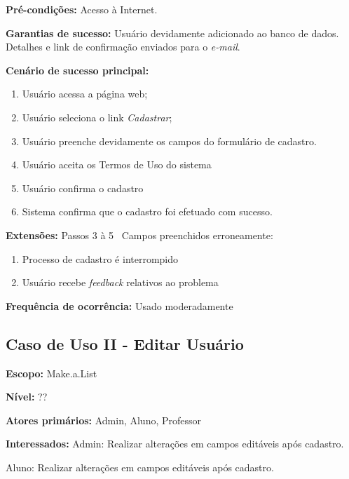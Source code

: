 \documentclass[12pt,oneside,a4paper,article]{abntex2}
\begin{document}
		\textbf{Pré-condições:} Acesso à Internet.
		
		\textbf{Garantias de sucesso:} Usuário devidamente adicionado ao banco de dados. Detalhes e link de confirmação enviados para o \textit{e-mail}.  
		
		\textbf{Cenário de sucesso principal:}
		
		\begin{enumerate}
			\item Usuário acessa a página web;
			
			\item Usuário seleciona o link \textit{Cadastrar};
			
			\item Usuário preenche devidamente os campos do formulário de cadastro.
			
			\item Usuário aceita os Termos de Uso do sistema
			
			\item Usuário confirma o cadastro
			
			\item Sistema confirma que o cadastro foi efetuado com sucesso.
		\end{enumerate}
		
		\textbf{Extensões:} Passos 3 à 5 \textrightarrow \ Campos preenchidos erroneamente:
		
			\begin{enumerate}[label=\alph*.]	
				\item Processo de cadastro é interrompido
				\item Usuário recebe \textit{feedback} relativos ao problema	
			\end{enumerate}
		
		\textbf{Frequência de ocorrência:} Usado moderadamente
			
		\subsection{Caso de Uso II - Editar Usuário}
		
		\textbf{Escopo:} Make.a.List 
		
		\textbf{Nível:} ??
		
		\textbf{Atores primários:} Admin, Aluno, Professor
		
		\textbf{Interessados:} Admin: Realizar alterações em campos editáveis após cadastro.
		
		Aluno: Realizar alterações em campos editáveis após cadastro.
		
\end{document}
